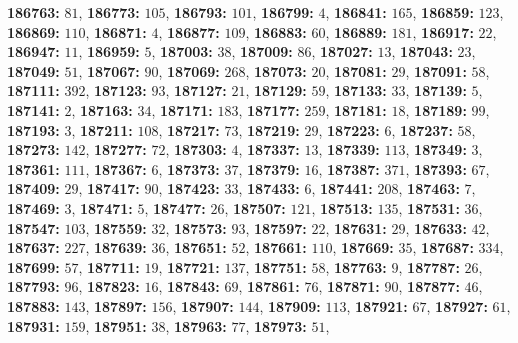 \textsf{\bfseries 186763:} $81$, \textsf{\bfseries 186773:} $105$, \textsf{\bfseries 186793:} $101$, \textsf{\bfseries 186799:} $4$, \textsf{\bfseries 186841:} $165$, \textsf{\bfseries 186859:} $123$, \textsf{\bfseries 186869:} $110$, \textsf{\bfseries 186871:} $4$, \textsf{\bfseries 186877:} $109$, \textsf{\bfseries 186883:} $60$, \textsf{\bfseries 186889:} $181$, \textsf{\bfseries 186917:} $22$, \textsf{\bfseries 186947:} $11$, \textsf{\bfseries 186959:} $5$, \textsf{\bfseries 187003:} $38$, \textsf{\bfseries 187009:} $86$, \textsf{\bfseries 187027:} $13$, \textsf{\bfseries 187043:} $23$, \textsf{\bfseries 187049:} $51$, \textsf{\bfseries 187067:} $90$, \textsf{\bfseries 187069:} $268$, \textsf{\bfseries 187073:} $20$, \textsf{\bfseries 187081:} $29$, \textsf{\bfseries 187091:} $58$, \textsf{\bfseries 187111:} $392$, \textsf{\bfseries 187123:} $93$, \textsf{\bfseries 187127:} $21$, \textsf{\bfseries 187129:} $59$, \textsf{\bfseries 187133:} $33$, \textsf{\bfseries 187139:} $5$, \textsf{\bfseries 187141:} $2$, \textsf{\bfseries 187163:} $34$, \textsf{\bfseries 187171:} $183$, \textsf{\bfseries 187177:} $259$, \textsf{\bfseries 187181:} $18$, \textsf{\bfseries 187189:} $99$, \textsf{\bfseries 187193:} $3$, \textsf{\bfseries 187211:} $108$, \textsf{\bfseries 187217:} $73$, \textsf{\bfseries 187219:} $29$, \textsf{\bfseries 187223:} $6$, \textsf{\bfseries 187237:} $58$, \textsf{\bfseries 187273:} $142$, \textsf{\bfseries 187277:} $72$, \textsf{\bfseries 187303:} $4$, \textsf{\bfseries 187337:} $13$, \textsf{\bfseries 187339:} $113$, \textsf{\bfseries 187349:} $3$, \textsf{\bfseries 187361:} $111$, \textsf{\bfseries 187367:} $6$, \textsf{\bfseries 187373:} $37$, \textsf{\bfseries 187379:} $16$, \textsf{\bfseries 187387:} $371$, \textsf{\bfseries 187393:} $67$, \textsf{\bfseries 187409:} $29$, \textsf{\bfseries 187417:} $90$, \textsf{\bfseries 187423:} $33$, \textsf{\bfseries 187433:} $6$, \textsf{\bfseries 187441:} $208$, \textsf{\bfseries 187463:} $7$, \textsf{\bfseries 187469:} $3$, \textsf{\bfseries 187471:} $5$, \textsf{\bfseries 187477:} $26$, \textsf{\bfseries 187507:} $121$, \textsf{\bfseries 187513:} $135$, \textsf{\bfseries 187531:} $36$, \textsf{\bfseries 187547:} $103$, \textsf{\bfseries 187559:} $32$, \textsf{\bfseries 187573:} $93$, \textsf{\bfseries 187597:} $22$, \textsf{\bfseries 187631:} $29$, \textsf{\bfseries 187633:} $42$, \textsf{\bfseries 187637:} $227$, \textsf{\bfseries 187639:} $36$, \textsf{\bfseries 187651:} $52$, \textsf{\bfseries 187661:} $110$, \textsf{\bfseries 187669:} $35$, \textsf{\bfseries 187687:} $334$, \textsf{\bfseries 187699:} $57$, \textsf{\bfseries 187711:} $19$, \textsf{\bfseries 187721:} $137$, \textsf{\bfseries 187751:} $58$, \textsf{\bfseries 187763:} $9$, \textsf{\bfseries 187787:} $26$, \textsf{\bfseries 187793:} $96$, \textsf{\bfseries 187823:} $16$, \textsf{\bfseries 187843:} $69$, \textsf{\bfseries 187861:} $76$, \textsf{\bfseries 187871:} $90$, \textsf{\bfseries 187877:} $46$, \textsf{\bfseries 187883:} $143$, \textsf{\bfseries 187897:} $156$, \textsf{\bfseries 187907:} $144$, \textsf{\bfseries 187909:} $113$, \textsf{\bfseries 187921:} $67$, \textsf{\bfseries 187927:} $61$, \textsf{\bfseries 187931:} $159$, \textsf{\bfseries 187951:} $38$, \textsf{\bfseries 187963:} $77$, \textsf{\bfseries 187973:} $51$, 

